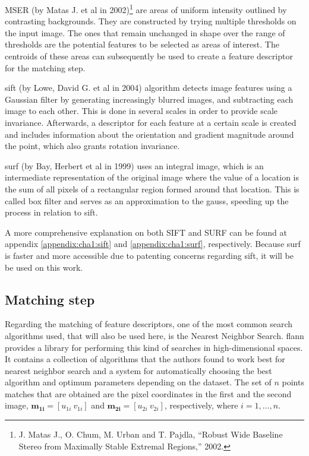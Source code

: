 MSER (by Matas J. et al in 2002)\footnote{J. Matas J., O. Chum, M. Urban and T. Pajdla, “Robust Wide Baseline Stereo from Maximally Stable Extremal Regions,” 2002.} are areas of uniform intensity outlined by contrasting backgrounds. They are constructed by trying multiple thresholds on the input image. The ones that remain unchanged in shape over the range of thresholds are the potential features to be selected as areas of interest. The centroids of these areas can subsequently be used to create a feature descriptor for the matching step.

\acrshort{sift} (by Lowe, David G. et al in 2004) \cite{sift} algorithm detects image features using a Gaussian filter by generating increasingly blurred images, and subtracting each image to each other. This is done in several scales in order to provide scale invariance. Afterwards, a descriptor for each feature at a certain scale is created and includes information about the orientation and gradient magnitude around the point, which also grants rotation invariance.

\acrshort{surf} (by Bay, Herbert et al in 1999) \cite{surf} uses an integral image, which is an intermediate representation of the original image where the value of a location is the sum of all pixels of a rectangular region formed around that location. This is called box filter and serves as an approximation to the \gls{gauss}, speeding up the process in relation to \acrshort{sift}.

A more comprehensive explanation on both SIFT and SURF can be found at appendix \ref{appendix:cha1:sift} and \ref{appendix:cha1:surf}, respectively. Because \acrshort{surf} is faster and more accessible due to patenting concerns regarding \acrshort{sift}, it will be be used on this work.

\subsection{Matching step}
Regarding the matching of feature descriptors, one of the most common search algorithms used, that will also be used here, is the Nearest Neighbor Search. \acrfull{flann} \cite{flann} provides a library for performing this kind of searches in high-dimensional spaces. It contains a collection of algorithms that the authors found to  work best for nearest neighbor search and a system for automatically choosing the best algorithm and optimum parameters depending on the dataset. The set of $n$ points matches that are obtained are the pixel coordinates in the first and the second image, $\mathbf{m_{1i}} = [u_{1i} \ v_{1i}]$ and $\mathbf{m_{2i}} = [u_{2i} \ v_{2i}]$, respectively, where $i=1,...,n$.

